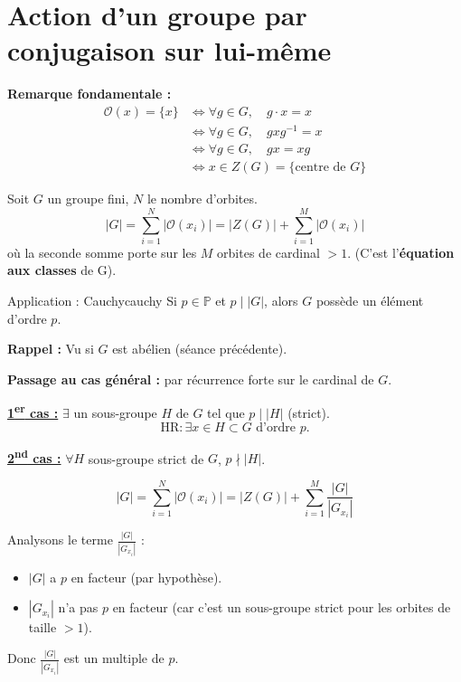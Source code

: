 \section*{Action d'un groupe par conjugaison sur lui-même}

\begin{remarque}
\textbf{Remarque fondamentale :}
\begin{align*}
    \mathcal{O}(x) = \{x\} &\iff \forall g \in G, \quad g \cdot x = x \\
    &\iff \forall g \in G, \quad g x g^{-1} = x \\
    &\iff \forall g \in G, \quad gx = xg \\
    &\iff x \in Z(G) = \{ \text{centre de } G \}
\end{align*}
\end{remarque}

Soit $G$ un groupe fini, $N$ le nombre d'orbites.
\[ |G| = \sum_{i=1}^N |\mathcal{O}(x_i)| = |Z(G)| + \sum_{i=1}^M |\mathcal{O}(x_i)| \]
où la seconde somme porte sur les $M$ orbites de cardinal $> 1$. (C'est l'\textbf{équation aux classes} de G).

\vspace{0.5cm}

\begin{theoreme}{Application : Cauchy}{cauchy}
Si $p \in \mathbb{P}$ et $p \mid |G|$, alors $G$ possède un élément d'ordre $p$.
\end{theoreme}

\textbf{Rappel :} Vu si $G$ est abélien (séance précédente).

\textbf{Passage au cas général :} par récurrence forte sur le cardinal de $G$.

\underline{\textbf{1\textsuperscript{er} cas :}} $\exists$ un sous-groupe $H$ de $G$ tel que $p \mid |H|$ (strict).
\[ \text{HR} : \exists x \in H \subset G \text{ d'ordre } p. \]

\underline{\textbf{2\textsuperscript{nd} cas :}} $\forall H$ sous-groupe strict de $G$, $p \nmid |H|$.

\[ |G| = \sum_{i=1}^N |\mathcal{O}(x_i)| = |Z(G)| + \sum_{i=1}^M \frac{|G|}{|G_{x_i}|} \]

Analysons le terme $\frac{|G|}{|G_{x_i}|}$ :
\begin{itemize}
    \item $|G|$ a $p$ en facteur (par hypothèse).
    \item $|G_{x_i}|$ n'a pas $p$ en facteur (car c'est un sous-groupe strict pour les orbites de taille $>1$).
\end{itemize}
Donc $\frac{|G|}{|G_{x_i}|}$ est un multiple de $p$.

